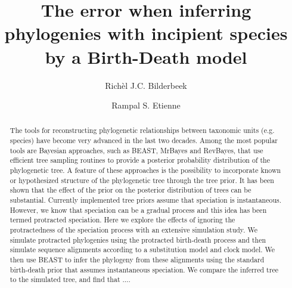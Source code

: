 \documentclass{article}
\title{The error when inferring phylogenies with incipient species by a Birth-Death model}
\author[1]{Rich\`el J.C. Bilderbeek}
\author[1]{Rampal S. Etienne}
\affil[1]{Groningen Institute for Evolutionary Life Sciences, University of Groningen, Groningen, The Netherlands}
\begin{document}
\maketitle

\begin{abstract}












  The tools for reconstructing phylogenetic relationships between taxonomic 
  units (e.g. species) have become very advanced in the last two decades. 
  Among the most popular tools are Bayesian approaches, such as BEAST, MrBayes and RevBayes, 
  that use efficient tree sampling routines to provide a posterior probability distribution 
  of the phylogenetic tree. A feature of these approaches is the possibility to incorporate 
  known or hypothesized structure of the phylogenetic tree through the tree prior. It has 
  been shown that the effect of the prior on the posterior distribution of trees can 
  be substantial. Currently implemented tree priors assume that speciation is 
  instantaneous. However, we know that speciation can be a gradual process and this 
  idea has been termed protracted speciation. Here we explore the effects of ignoring 
  the protractedness of the speciation process with an extensive simulation study. 
  We simulate protracted phylogenies using the protracted birth-death process 
  and then simulate sequence alignments according to a substitution model and clock model. 
  We then use BEAST to infer the phylogeny from these alignments using the standard 
  birth-death prior that assumes instantaneous speciation. We compare the 
  inferred tree to the simulated tree, and find that ....


\end{abstract}
\end{document}
